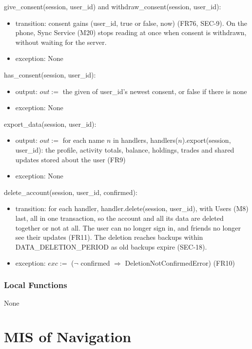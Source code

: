 \documentclass[12pt, titlepage]{article}
\begin{document}
\noindent give\_consent(session, user\_id) and withdraw\_consent(session,
user\_id):
\begin{itemize}
\item transition: consent gains (user\_id, true or false, now) (FR76,
  SEC-9). On the phone, Sync Service (M20) stops reading at once when consent
  is withdrawn, without waiting for the server.
\item exception: None
\end{itemize}

\noindent has\_consent(session, user\_id):
\begin{itemize}
\item output: $out :=$ the given of user\_id's newest consent, or false if
  there is none
\item exception: None
\end{itemize}

\noindent export\_data(session, user\_id):
\begin{itemize}
\item output: $out :=$ for each name $n$ in handlers,
  handlers($n$).export(session, user\_id): the profile, activity totals,
  balance, holdings, trades and shared updates stored about the user (FR9)
\item exception: None
\end{itemize}

\noindent delete\_account(session, user\_id, confirmed):
\begin{itemize}
\item transition: for each handler, handler.delete(session, user\_id), with
  Users (M8) last, all in one transaction, so the account and all its data are
  deleted together or not at all. The user can no longer sign in, and
  friends no longer see their updates (FR11). The deletion reaches backups
  within DATA\_DELETION\_PERIOD as old backups expire (SEC-18).
\item exception: $exc :=$ ($\neg$ confirmed $\Rightarrow$
  DeletionNotConfirmedError) (FR10)
\end{itemize}

\subsubsection{Local Functions}

None

\par\endgroup

\newpage

\section{MIS of Navigation} \label{MisNavigation}
\end{document}
